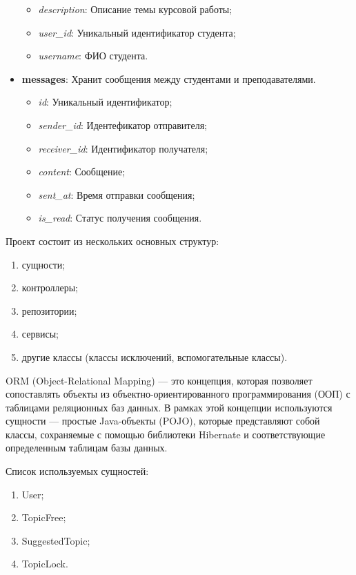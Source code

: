 \documentclass[14pt]{extarticle} %
\begin{document}
\begin{itemize}
\begin{itemize}
        \item \textit{description}: Описание темы курсовой работы;
        \item \textit{user\_id}: Уникальный идентификатор студента;
        \item \textit{username}: ФИО студента.
    \end{itemize}
    \item \textbf{messages}: Хранит сообщения между студентами и преподавателями.
    \begin{itemize}
        \item \textit{id}: Уникальный идентификатор;
        \item \textit{sender\_id}: Идентефикатор отправителя;
        \item \textit{receiver\_id}: Идентификатор получателя;
        \item \textit{content}: Сообщение;
        \item \textit{sent\_at}: Время отправки сообщения;
        \item \textit{is\_read}: Статус получения сообщения.
    \end{itemize}
\end{itemize}   

Проект состоит из нескольких основных структур:
\begin{enumerate}[label=\arabic*)]
    \item сущности;
    \item контроллеры;
    \item репозитории;
    \item сервисы;
    \item другие классы (классы исключений, вспомогательные классы).
\end{enumerate}

ORM (Object-Relational Mapping) — это концепция, которая позволяет сопоставлять объекты из объектно-ориентированного программирования (ООП) с таблицами реляционных баз данных. В рамках этой концепции используются сущности — простые Java-объекты (POJO), которые представляют собой классы, сохраняемые с помощью библиотеки Hibernate и соответствующие определенным таблицам базы данных.

Список используемых сущностей:
\begin{enumerate}
    \item User;
    \item TopicFree;
    \item SuggestedTopic;
    \item TopicLock.
\end{enumerate}
\end{document}

